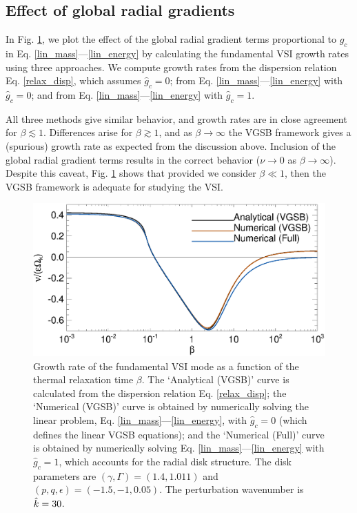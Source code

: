 \subsection{Effect of global radial gradients}
In  Fig. \ref{gcorr_compare}, we plot the effect of the global radial gradient terms
proportional to $\hat{g}_c$ in Eq. \ref{lin_mass}---\ref{lin_energy}
by calculating the
fundamental VSI growth rates using three approaches. We compute growth rates from the dispersion
relation Eq. \ref{relax_disp}, which assumes $\hat{g}_c=0$;  from
Eq. \ref{lin_mass}---\ref{lin_energy} with $\hat{g}_c=0$; and from
Eq. \ref{lin_mass}---\ref{lin_energy}  with $\hat{g}_c=1$.   

All three methods give similar behavior, and growth rates are in close
agreement for $\beta\lesssim 1$. Differences arise for 
$\beta\gtrsim1$, and as $\beta\to\infty$ the VGSB framework gives a
(spurious) growth rate as expected from the discussion
above. Inclusion of the global radial gradient terms results in the
correct behavior  ($\nu\to0$ as $\beta\to\infty$). Despite this
caveat, Fig. \ref{gcorr_compare} shows that provided we consider
$\beta\ll1$, then the VGSB framework is adequate for studying the
VSI. 
  
\begin{figure}
  \includegraphics[width=\linewidth,clip=true,trim=0cm 0.0cm 0cm
  0cm]{figures/gcorr_compare} 
  \caption{Growth rate of the fundamental VSI mode as a function of
    the thermal relaxation time $\beta$. The `Analytical (VGSB)' curve
    is calculated from the dispersion relation Eq. \ref{relax_disp};
    the `Numerical (VGSB)' curve is obtained by numerically solving
    the linear problem, Eq. \ref{lin_mass}---\ref{lin_energy}, with $\hat{g}_c=0$
    (which defines the linear VGSB equations); and the `Numerical
    (Full)' curve is obtained by numerically solving 
    Eq. \ref{lin_mass}---\ref{lin_energy}  with $\hat{g}_c=1$, which
    accounts for the radial disk structure.  
    The disk parameters are $(\gamma, \Gamma)=(1.4, 1.011)$ and
    $(p,q,\epsilon)=(-1.5,-1,0.05)$. The perturbation
    wavenumber is $\hat{k}=30$. 
    \label{gcorr_compare}}  
\end{figure}


